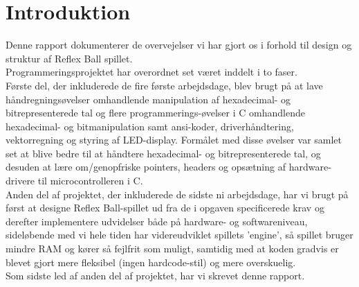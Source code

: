 \chapter{Introduktion}
Denne rapport dokumenterer de overvejelser vi har gjort os i forhold til design og struktur af Reflex Ball spillet. \\
Programmeringsprojektet har overordnet set været inddelt i to faser.\\

Første del, der inkluderede de fire første arbejdsdage, blev brugt på at lave håndregningsøvelser omhandlende manipulation af hexadecimal- og bitrepresenterede tal og flere programmerings-øvelser i C omhandlende hexadecimal- og bitmanipulation samt ansi-koder, driverhåndtering, vektorregning og styring af LED-display. Formålet med disse øvelser var samlet set at blive bedre til at håndtere hexadecimal- og bitrepresenterede tal, og desuden at lære om/genopfriske pointers, headers og opsætning af hardware-drivere til microcontrolleren i C.\\

Anden del af projektet, der inkluderede de sidste ni arbejdsdage, har vi brugt på først at designe Reflex Ball-spillet ud fra de i opgaven specificerede krav og derefter implementere udvidelser både på hardware- og softwareniveau, sideløbende med vi hele tiden har videreudviklet spillets 'engine', så spillet bruger mindre RAM og kører så fejlfrit som muligt, samtidig med at koden gradvis er blevet gjort mere fleksibel (ingen hardcode-stil) og mere overskuelig.\\
Som sidste led af anden del af projektet, har vi skrevet denne rapport.
